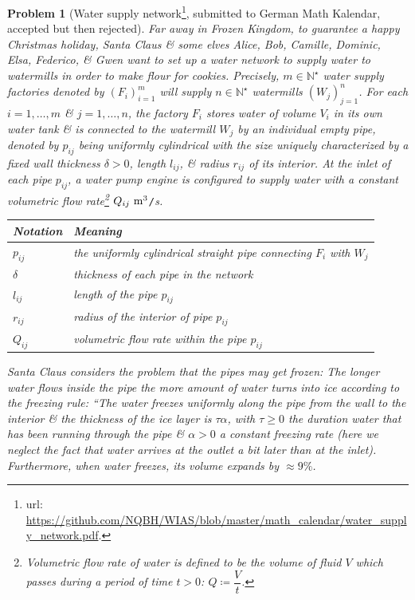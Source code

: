 \documentclass[12pt,twoside]{book}
\newtheorem{problem}{Problem}
\begin{document}
\begin{problem}[Water supply network\footnote{{\sc url}: \url{https://github.com/NQBH/WIAS/blob/master/math_calendar/water_supply_network.pdf}.}, submitted to German {\sc Math Kalendar}, accepted but then rejected]
	Far away in Frozen Kingdom, to guarantee a happy Christmas holiday, Santa Claus \& some elves Alice, Bob, Camille, Dominic, Elsa, Federico, \& Gwen want to set up a water network to supply water to watermills in order to make flour for cookies. Precisely, $m\in\mathbb{N}^\star$ water supply factories denoted by $(F_i)_{i=1}^m$ will supply $n\in\mathbb{N}^\star$ watermills $(W_j)_{j=1}^n$. For each $i = 1,\ldots,m$ \& $j = 1,\ldots,n$, the factory $F_i$ stores water of volume $V_i$ in its own water tank \& is connected to the watermill $W_j$ by an individual empty pipe, denoted by $p_{ij}$ being uniformly cylindrical with the size uniquely characterized by a fixed wall thickness $\delta > 0$, length $l_{ij}$, \& radius $r_{ij}$ of its interior. At the inlet of each pipe $p_{ij}$, a water pump engine is configured to supply water with a constant \emph{volumetric flow rate}\footnote{{\it Volumetric flow rate} of water is defined to be the volume of fluid $V$ which passes during a period of time $t > 0$: $Q\coloneqq\dfrac{V}{t}$.} $Q_{ij}\ {\rm m}^3${\tt/}{\rm s}.
	\begin{table}[H]
		\centering
		\begin{tabular}{|l|l|}
			\hline
			Notation & Meaning \\
			\hline
			$p_{ij}$ & the uniformly cylindrical straight pipe connecting $F_i$ with $W_j$ \\
			\hline
			$\delta$ & thickness of each pipe in the network \\
			\hline
			$l_{ij}$ & length of the pipe $p_{ij}$ \\
			\hline
			$r_{ij}$ & radius of the interior of pipe $p_{ij}$ \\
			\hline
			$Q_{ij}$ & volumetric ﬂow rate within the pipe $p_{ij}$ \\
			\hline
		\end{tabular}
	\end{table}
	Santa Claus considers the problem that the pipes may get frozen: The longer water flows inside the pipe the more amount of water turns into ice according to the \emph{freezing rule}: ``The water freezes uniformly along the pipe from the wall to the interior \& the thickness of the ice layer is $\tau\alpha$, with $\tau\ge0$ the duration water that has been running through the pipe \& $\alpha > 0$ a constant freezing rate (here we neglect the fact that water arrives at the outlet a bit later than at the inlet). Furthermore, when water freezes, its volume expands by $\approx9\%$.
	

\end{problem}
\end{document}
